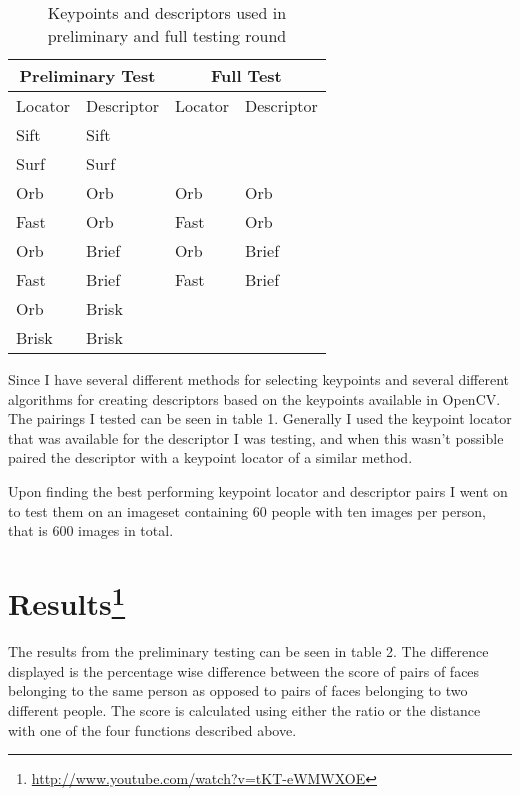 \documentclass{article}
\begin{document}
\begin{table}[t]
\begin{center}
	\begin{tabular}{l l|l l}
		\multicolumn{2}{c}{Preliminary Test} & \multicolumn{2}{c}{Full Test} \\
		\hline
		Locator & Descriptor & Locator & Descriptor \\
		\hline
		Sift & Sift & &\\
		Surf & Surf & &\\
		Orb & Orb & Orb & Orb \\
		Fast & Orb & Fast & Orb \\
		Orb & Brief & Orb & Brief \\
		Fast & Brief & Fast & Brief \\
		Orb & Brisk & & \\
		Brisk & Brisk & & \\
	\end{tabular}
	\label{table:features}
	\caption{Keypoints and descriptors used in preliminary and full testing 
round}
\end{center}
\end{table}

Since I have several different methods for selecting keypoints and several 
different algorithms for creating descriptors based on the keypoints 
available in OpenCV. The pairings I tested can be seen in table 1.  
Generally I used the keypoint locator that was available for the 
descriptor I was testing, and when this wasn't possible paired the 
descriptor with a keypoint locator of a similar method.

Upon finding the best performing keypoint locator and descriptor pairs I went 
on to test them on an imageset containing $60$ people with ten images per 
person, that is $600$ images in total.

\section{Results\footnote{%
\href{http://www.youtube.com/watch?v=tKT-eWMWXOE}{http://www.youtube.com/watch?v=tKT-eWMWXOE}}}

The results from the preliminary testing can be seen in table 2.  The 
difference displayed is the percentage wise difference between the score 
of pairs of faces belonging to the same person as opposed to pairs of 
faces belonging to two different people. The score is calculated using 
either the ratio or the distance with one of the four functions 
described above.
\end{document}
